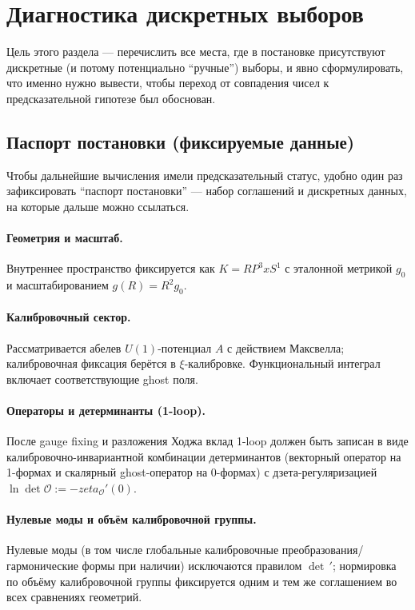 \documentclass[12pt]{article}
\def\mathbb#1{#1}%
\def\times{x}%
\def\zeta{zeta}%
\begin{document}
\section{Диагностика дискретных выборов}
Цель этого раздела --- перечислить все места, где в постановке присутствуют дискретные (и потому потенциально ``ручные'') выборы, и явно сформулировать, что именно нужно вывести, чтобы переход от совпадения чисел к предсказательной гипотезе был обоснован.

\subsection{Паспорт постановки (фиксируемые данные)}
Чтобы дальнейшие вычисления имели предсказательный статус, удобно один раз зафиксировать ``паспорт постановки'' --- набор соглашений и дискретных данных, на которые дальше можно ссылаться.

\paragraph{Геометрия и масштаб.}
Внутреннее пространство фиксируется как $K=\mathbb{RP}^3\times S^1$ с эталонной метрикой $g_0$ и масштабированием $g(R)=R^2 g_0$.

\paragraph{Калибровочный сектор.}
Рассматривается абелев $U(1)$-потенциал $A$ с действием Максвелла; калибровочная фиксация берётся в $\xi$-калибровке.
Функциональный интеграл включает соответствующие ghost поля.

\paragraph{Операторы и детерминанты (1-loop).}
После gauge fixing и разложения Ходжа вклад 1-loop должен быть записан в виде калибровочно-инвариантной комбинации детерминантов
(векторный оператор на 1-формах и скалярный ghost-оператор на 0-формах) с дзета-регуляризацией
$\ln\det\mathcal{O}:=-\zeta_{\mathcal{O}}'(0)$.

\paragraph{Нулевые моды и объём калибровочной группы.}
Нулевые моды (в том числе глобальные калибровочные преобразования/гармонические формы при наличии) исключаются правилом $\det\,'$;
нормировка по объёму калибровочной группы фиксируется одним и тем же соглашением во всех сравнениях геометрий.
\end{document}
